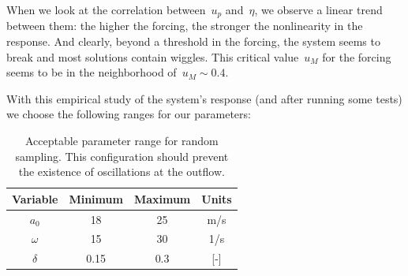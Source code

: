 \documentclass[../../thesis.tex]{subfiles}
\begin{document}
When we look at the correlation between~$u_p$ and~$\eta$, we observe a linear trend between them: the higher the forcing, the stronger the nonlinearity in the response.
And clearly, beyond a threshold in the forcing, the system seems to break and most solutions contain wiggles.
This critical value~$u_M$ for the forcing seems to be in the neighborhood of~$u_M \sim 0.4$. 

With this empirical study of the system's response (and after running some tests) we choose the following ranges for our parameters:
\begin{table}[h]
    \centering
    \caption{Acceptable parameter range for random sampling. This configuration should prevent the existence of oscillations at the outflow.}
    \begin{tabular}{cccc}
    \toprule
        Variable  & Minimum & Maximum & Units 
        \\ \midrule
        $a_0$     & 18      & 25      & m/s \\
        $\omega$  & 15      & 30      & 1/s \\
        $\delta$  & 0.15    & 0.3     & [-]
        \\ \bottomrule
    \end{tabular}
\end{table}
\end{document}
